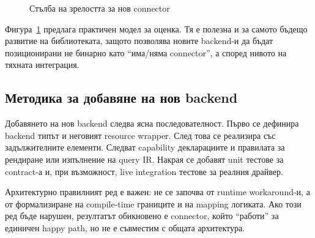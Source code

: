 \begin{figure}[H]
\centering
{}
\caption{Стълба на зрелостта за нов connector}
\label{fig:connector_maturity_ladder}
\end{figure}

Фигура~\ref{fig:connector_maturity_ladder} предлага практичен модел за оценка. Тя е полезна и за самото бъдещо развитие на библиотеката, защото позволява новите backend-и да бъдат позиционирани не бинарно като ``има/няма connector'', а според нивото на тяхната интеграция.

\subsection{Методика за добавяне на нов backend}

Добавянето на нов backend следва ясна последователност. Първо се дефинира backend типът и неговият resource wrapper. След това се реализира  със задължителните елементи. Следват capability декларациите и правилата за рендиране или изпълнение на query IR. Накрая се добавят unit тестове за contract-а и, при възможност, live integration тестове за реалния драйвер.

Архитектурно правилният ред е важен: не се започва от runtime workaround-и, а от формализиране на compile-time границите и на mapping логиката. Ако този ред бъде нарушен, резултатът обикновено е connector, който ``работи'' за единичен happy path, но не е съвместим с общата архитектура.

